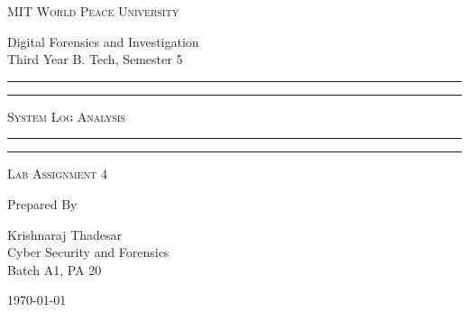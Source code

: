 \documentclass[11pt]{article}
\begin{document}
\begin{titlepage}
    \centering


    \huge\textsc{
        MIT World Peace University
    }\\

    \vspace{0.75\baselineskip} %

    \LARGE{
        Digital Forensics and Investigation\\
        Third Year B. Tech, Semester 5
    }

    \vfill %


    \rule{\textwidth}{1.6pt}\vspace*{-\baselineskip}\vspace*{2pt}
    \rule{\textwidth}{0.6pt}
    \vspace{0.75\baselineskip} %



    \huge{\textsc{
            System Log Analysis
        }} \\



    \vspace{0.5\baselineskip} %
    \rule{\textwidth}{0.6pt}\vspace*{-\baselineskip}\vspace*{2.8pt}
    \rule{\textwidth}{1.6pt}

    \vspace{1\baselineskip} %


    \LARGE\textsc{
        Lab Assignment 4
    } %
    \vfill


    Prepared By
    \vspace{0.5\baselineskip} %

    \Large{
        Krishnaraj Thadesar \\
        Cyber Security and Forensics\\
        Batch A1, PA 20
    }


    \vspace{0.5\baselineskip} %
    \today

\end{titlepage}
\end{document}
